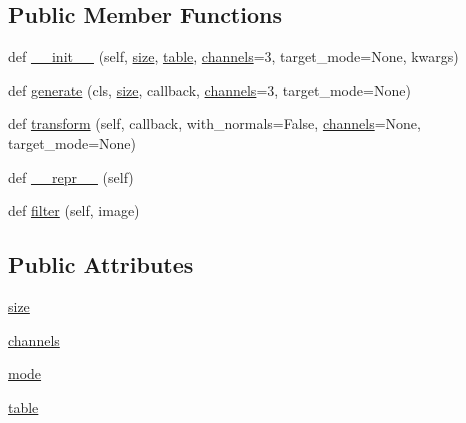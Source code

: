 \subsection*{Public Member Functions}
\begin{DoxyCompactItemize}
\item 
def \hyperlink{classPIL_1_1ImageFilter_1_1Color3DLUT_ab70ae59c97e89d904b527cad95ed338b}{\+\_\+\+\_\+init\+\_\+\+\_\+} (self, \hyperlink{classPIL_1_1ImageFilter_1_1Color3DLUT_a6f1455a0cd9d5a278b562221c644eb10}{size}, \hyperlink{classPIL_1_1ImageFilter_1_1Color3DLUT_ade914f188474259b4692b1c71dc21299}{table}, \hyperlink{classPIL_1_1ImageFilter_1_1Color3DLUT_ae16d7d5a5d629353976dd429bf672cb6}{channels}=3, target\+\_\+mode=None, kwargs)
\item 
def \hyperlink{classPIL_1_1ImageFilter_1_1Color3DLUT_af80f64b84c0157d641cbf5b60bbc0606}{generate} (cls, \hyperlink{classPIL_1_1ImageFilter_1_1Color3DLUT_a6f1455a0cd9d5a278b562221c644eb10}{size}, callback, \hyperlink{classPIL_1_1ImageFilter_1_1Color3DLUT_ae16d7d5a5d629353976dd429bf672cb6}{channels}=3, target\+\_\+mode=None)
\item 
def \hyperlink{classPIL_1_1ImageFilter_1_1Color3DLUT_aa42987bda5ef095a42c5bea459143470}{transform} (self, callback, with\+\_\+normals=False, \hyperlink{classPIL_1_1ImageFilter_1_1Color3DLUT_ae16d7d5a5d629353976dd429bf672cb6}{channels}=None, target\+\_\+mode=None)
\item 
def \hyperlink{classPIL_1_1ImageFilter_1_1Color3DLUT_ada3e508b32204038ddd6a5792fa3bf8b}{\+\_\+\+\_\+repr\+\_\+\+\_\+} (self)
\item 
def \hyperlink{classPIL_1_1ImageFilter_1_1Color3DLUT_a35a58da3615f096d5f6bf6542dc4ea70}{filter} (self, image)
\end{DoxyCompactItemize}
\subsection*{Public Attributes}
\begin{DoxyCompactItemize}
\item 
\hyperlink{classPIL_1_1ImageFilter_1_1Color3DLUT_a6f1455a0cd9d5a278b562221c644eb10}{size}
\item 
\hyperlink{classPIL_1_1ImageFilter_1_1Color3DLUT_ae16d7d5a5d629353976dd429bf672cb6}{channels}
\item 
\hyperlink{classPIL_1_1ImageFilter_1_1Color3DLUT_a119ca47fe478502de4e1aa982bf26271}{mode}
\item 
\hyperlink{classPIL_1_1ImageFilter_1_1Color3DLUT_ade914f188474259b4692b1c71dc21299}{table}
\end{DoxyCompactItemize}
